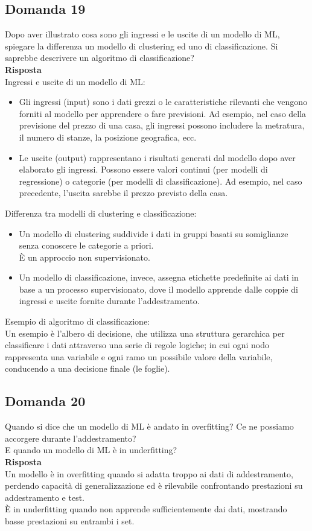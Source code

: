 \documentclass[../main.tex]{subfiles}
\begin{document}
	\subsection{Domanda 19}
	Dopo aver illustrato cosa sono gli ingressi e le uscite di un modello di ML, spiegare la differenza un modello di clustering ed uno di classificazione. Si saprebbe descrivere un algoritmo di classificazione?\\
	\textbf{Risposta}\\
	Ingressi e uscite di un modello di ML:
	\begin{itemize}
		\item Gli ingressi (input) sono i dati grezzi o le caratteristiche rilevanti che vengono forniti al modello per apprendere o fare previsioni. Ad esempio, nel caso della previsione del prezzo di una casa, gli ingressi possono includere la metratura, il numero di stanze, la posizione geografica, ecc.
		\item Le uscite (output) rappresentano i risultati generati dal modello dopo aver elaborato gli ingressi. Possono essere valori continui (per modelli di regressione) o categorie (per modelli di classificazione). Ad esempio, nel caso precedente, l'uscita sarebbe il prezzo previsto della casa.
	\end{itemize}
	Differenza tra modelli di clustering e classificazione:
	\begin{itemize}
		\item Un modello di clustering suddivide i dati in gruppi basati su somiglianze senza conoscere le categorie a priori. \\
		È un approccio non supervisionato.
		\item Un modello di classificazione, invece, assegna etichette predefinite ai dati in base a un processo supervisionato, dove il modello apprende dalle coppie di ingressi e uscite fornite durante l'addestramento.
	\end{itemize}
	Esempio di algoritmo di classificazione:\\
	Un esempio è l'albero di decisione, che utilizza una struttura gerarchica per classificare i dati attraverso una serie di regole logiche; in cui ogni nodo rappresenta una variabile e ogni ramo un possibile valore della variabile, conducendo a una decisione finale (le foglie).
	\subsection{Domanda 20}
	Quando si dice che un modello di ML è andato in overfitting? Ce ne possiamo accorgere durante l’addestramento? \\
	E quando un modello di ML è in underfitting?\\
	\textbf{Risposta}\\
	Un modello è in overfitting quando si adatta troppo ai dati di addestramento, perdendo capacità di generalizzazione ed è rilevabile confrontando prestazioni su addestramento e test.\\
	È in underfitting quando non apprende sufficientemente dai dati, mostrando basse prestazioni su entrambi i set.
\end{document}
